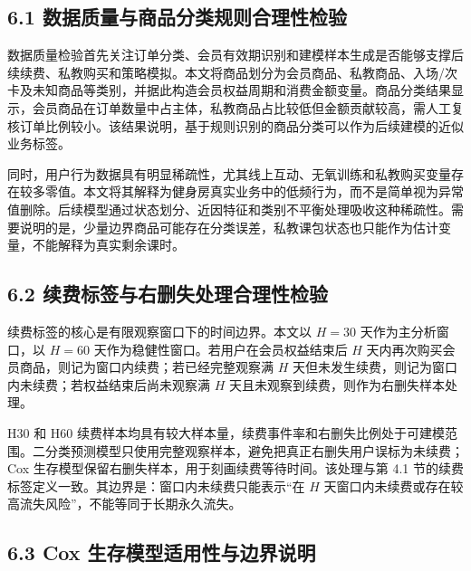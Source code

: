 \documentclass[
  12pt,
]{ctexart}
\begin{document}
\hypertarget{ux6570ux636eux8d28ux91cfux4e0eux5546ux54c1ux5206ux7c7bux89c4ux5219ux5408ux7406ux6027ux68c0ux9a8c}{%
\subsection{6.1 数据质量与商品分类规则合理性检验}\label{ux6570ux636eux8d28ux91cfux4e0eux5546ux54c1ux5206ux7c7bux89c4ux5219ux5408ux7406ux6027ux68c0ux9a8c}}

数据质量检验首先关注订单分类、会员有效期识别和建模样本生成是否能够支撑后续续费、私教购买和策略模拟。本文将商品划分为会员商品、私教商品、入场/次卡及未知商品等类别，并据此构造会员权益周期和消费金额变量。商品分类结果显示，会员商品在订单数量中占主体，私教商品占比较低但金额贡献较高，需人工复核订单比例较小。该结果说明，基于规则识别的商品分类可以作为后续建模的近似业务标签。

同时，用户行为数据具有明显稀疏性，尤其线上互动、无氧训练和私教购买变量存在较多零值。本文将其解释为健身房真实业务中的低频行为，而不是简单视为异常值删除。后续模型通过状态划分、近因特征和类别不平衡处理吸收这种稀疏性。需要说明的是，少量边界商品可能存在分类误差，私教课包状态也只能作为估计变量，不能解释为真实剩余课时。

\hypertarget{ux7eedux8d39ux6807ux7b7eux4e0eux53f3ux5220ux5931ux5904ux7406ux5408ux7406ux6027ux68c0ux9a8c}{%
\subsection{6.2 续费标签与右删失处理合理性检验}\label{ux7eedux8d39ux6807ux7b7eux4e0eux53f3ux5220ux5931ux5904ux7406ux5408ux7406ux6027ux68c0ux9a8c}}

续费标签的核心是有限观察窗口下的时间边界。本文以 \(H=30\) 天作为主分析窗口，以 \(H=60\) 天作为稳健性窗口。若用户在会员权益结束后 \(H\) 天内再次购买会员商品，则记为窗口内续费；若已经完整观察满 \(H\) 天但未发生续费，则记为窗口内未续费；若权益结束后尚未观察满 \(H\) 天且未观察到续费，则作为右删失样本处理。

H30 和 H60 续费样本均具有较大样本量，续费事件率和右删失比例处于可建模范围。二分类预测模型只使用完整观察样本，避免把真正右删失用户误标为未续费；Cox 生存模型保留右删失样本，用于刻画续费等待时间。该处理与第 4.1 节的续费标签定义一致。其边界是：窗口内未续费只能表示``在 \(H\) 天窗口内未续费或存在较高流失风险''，不能等同于长期永久流失。

\hypertarget{cox-ux751fux5b58ux6a21ux578bux9002ux7528ux6027ux4e0eux8fb9ux754cux8bf4ux660e}{%
\subsection{6.3 Cox 生存模型适用性与边界说明}\label{cox-ux751fux5b58ux6a21ux578bux9002ux7528ux6027ux4e0eux8fb9ux754cux8bf4ux660e}}
\end{document}

